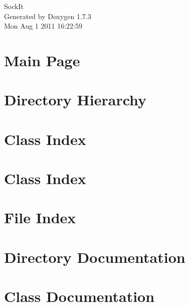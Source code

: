 \documentclass[a4paper]{book}
\begin{document}
\hypersetup{pageanchor=false}
\begin{titlepage}
\vspace*{7cm}
\begin{center}
{\Large SockIt }\\
\vspace*{1cm}
{\large Generated by Doxygen 1.7.3}\\
\vspace*{0.5cm}
{\small Mon Aug 1 2011 16:22:59}\\
\end{center}
\end{titlepage}
\clearemptydoublepage
{}
\tableofcontents
\clearemptydoublepage
{}
\hypersetup{pageanchor=true}
\chapter{Main Page}
\label{index}\hypertarget{index}{}
\chapter{Directory Hierarchy}

\chapter{Class Index}

\chapter{Class Index}

\chapter{File Index}

\chapter{Directory Documentation}







\chapter{Class Documentation}

















\end{document}

